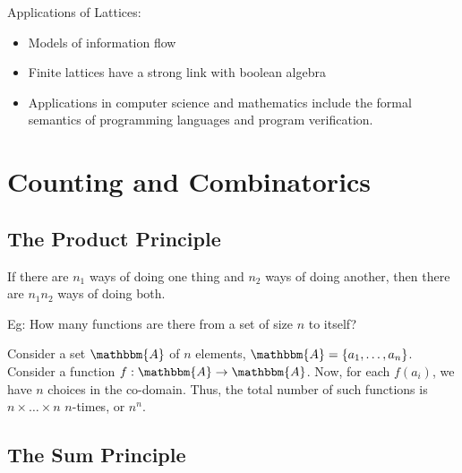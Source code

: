 \documentclass[14pt]{extarticle}
\newcommand{\A}{\mathbbm{A}}
\begin{document}
\begin{center}
\end{center}
Applications of Lattices:
\begin{itemize}
    \item Models of information flow
    \item Finite lattices have a strong link with boolean algebra
    \item Applications in computer science and mathematics include the formal semantics of programming languages and program verification.
\end{itemize}

\newpage

\section{Counting and Combinatorics}

\subsection{The Product Principle}

If there are $n_1$ ways of doing one thing and $n_2$ ways of doing another, then there are $n_1n_2$ ways of doing both.

Eg: How many functions are there from a set of size $n$ to itself?

Consider a set $\A$ of $n$ elements, $\A = \{a_1, \dots, a_n\}$. Consider a function $f : \A \to \A$. Now, for each $f(a_i)$, we have $n$ choices in the co-domain. Thus, the total number of such functions is $n \times \dots \times n$ $n$-times, or $n^n$.

\subsection{The Sum Principle}
\end{document}
